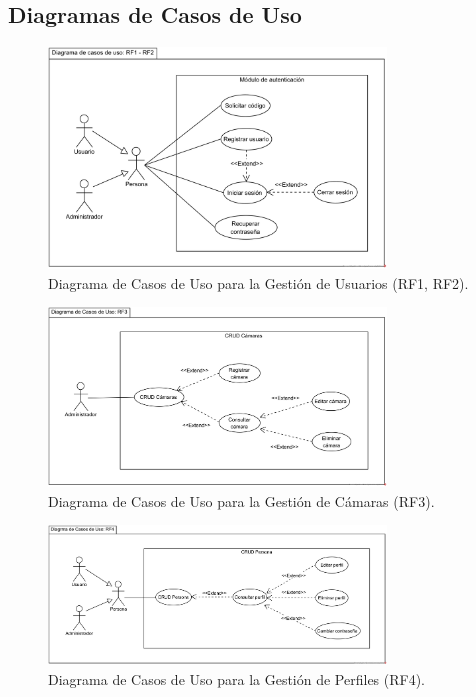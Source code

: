 
\subsection{Diagramas de Casos de Uso}

\begin{figure}[H]
    \centering
    \caption{Diagrama de Casos de Uso para la Gestión de Usuarios (RF1, RF2).}
    \label{fig:casos-uso-usuarios} %
    \includegraphics[width=0.8\textwidth]{UML/CasosUso/Diagrama de Casos de Uso RF1 RF2.png}
\end{figure}


\begin{figure}[H]
    \centering
    \caption{Diagrama de Casos de Uso para la Gestión de Cámaras (RF3).}
    \label{fig:casos-uso-camaras}
     \includegraphics[width=0.8\textwidth]{UML/CasosUso/Diagrama de Casos de Uso RF3.png}
\end{figure}


\begin{figure}[H]
    \centering
    \caption{Diagrama de Casos de Uso para la Gestión de Perfiles (RF4).}
    \label{fig:casos-uso-perfiles}
    \includegraphics[width=0.8\textwidth]{UML/CasosUso/Diagrama de Casos de Uso RF4.png}
\end{figure}


